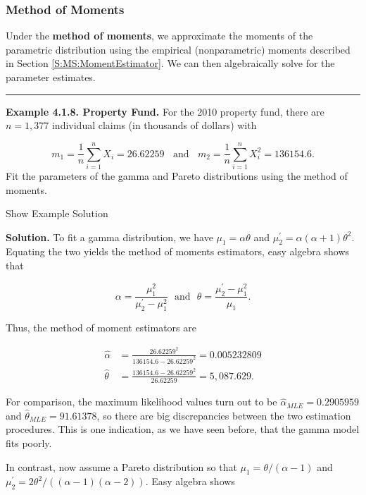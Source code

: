 \documentclass[]{book}
\theoremstyle{definition}
\theoremstyle{definition}
\theoremstyle{definition}
\theoremstyle{remark}
\begin{document}
\subsubsection{Method of Moments}\label{method-of-moments}

Under the \textbf{method of moments}, we approximate the moments of the
parametric distribution using the empirical (nonparametric) moments
described in Section \ref{S:MS:MomentEstimator}. We can then
algebraically solve for the parameter estimates.

\begin{center}\rule{0.5\linewidth}{\linethickness}\end{center}

\textbf{Example 4.1.8. Property Fund.} For the 2010 property fund, there
are \(n=1,377\) individual claims (in thousands of dollars) with

\[m_1 = \frac{1}{n} \sum_{i=1}^n X_i = 26.62259 \ \ \ \
\text{and} \ \ \ \
 m_2 = \frac{1}{n} \sum_{i=1}^n X_i^2 = 136154.6 .\] Fit the parameters
of the gamma and Pareto distributions using the method of moments.

Show Example Solution

\hypertarget{toggleExampleSelect.1.8}{}
\textbf{Solution.} To fit a gamma distribution, we have
\(\mu_1 = \alpha \theta\) and
\(\mu_2^{\prime} = \alpha(\alpha+1) \theta^2\). Equating the two yields
the method of moments estimators, easy algebra shows that

\[\alpha = \frac{\mu_1^2}{\mu_2^{\prime}-\mu_1^2}  \ \ \ \text{and} \ \ \  \theta = \frac{\mu_2^{\prime}-\mu_1^2}{\mu_1}.\]

Thus, the method of moment estimators are

\[
\begin{aligned}
\hat{\alpha} &=  \frac{26.62259^2}{136154.6-26.62259^2} = 0.005232809 \\
\hat{\theta} &=  \frac{136154.6-26.62259^2}{26.62259} = 5,087.629.
\end{aligned}
\]

For comparison, the maximum likelihood values turn out to be
\(\hat{\alpha}_{MLE} = 0.2905959\) and
\(\hat{\theta}_{MLE} = 91.61378\), so there are big discrepancies
between the two estimation procedures. This is one indication, as we
have seen before, that the gamma model fits poorly.

In contrast, now assume a Pareto distribution so that
\(\mu_1 = \theta/(\alpha -1)\) and
\(\mu_2^{\prime} = 2\theta^2/((\alpha-1)(\alpha-2) )\). Easy algebra
shows
\end{document}
